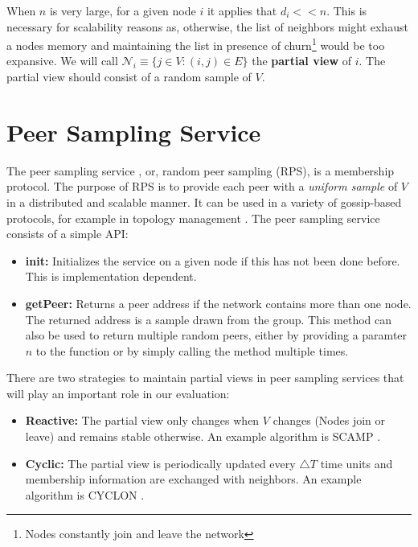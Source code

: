 \documentclass[11pt, english, screen]{report-rd-info}
\begin{document}
When $n$ is very large, for a given node $i$ it applies that $d_i << n$.
This is necessary for scalability reasons as, otherwise, the list of neighbors might exhaust a nodes memory and maintaining the list in presence of churn\footnote{Nodes constantly join and leave the network} would be too expansive.
We will call $\mathcal{N}_i \equiv \{j\in V:(i,j)\in E\}$ the \textbf{partial view} of $i$.
The partial view should consist of a random sample of $V$.

\section{Peer Sampling Service}

The peer sampling service \cite{Jelasity:2004:PSS:1045658.1045666}, or, random peer sampling (RPS), is a membership protocol.
The purpose of RPS is to provide each peer with a \emph{uniform sample} of $V$ in a distributed and scalable manner.
It can be used in a variety of gossip-based protocols, for example in topology management \cite{Jelasity:2009:TGF:1570533.1570626}. 
The peer sampling service consists of a simple API:

\begin{itemize}
    \item{\textbf{init:}} Initializes the service on a given node if this has not been done before. This is implementation dependent.
    \item{\textbf{getPeer:}} Returns a peer address if the network contains more than one node. The returned address is a sample drawn from the group. This method can also be used to return multiple random peers, either by providing a paramter $n$ to the function or by simply calling the method multiple times.
\end{itemize}

There are two strategies to maintain partial views in peer sampling services \cite{Leitao_gossip-basedbroadcast} that will play an important role in our evaluation:

\begin{itemize}
    \item{\textbf{Reactive:} The partial view only changes when $V$ changes (Nodes join or leave) and remains stable otherwise.
An example algorithm is SCAMP \cite{Ganesh:2001:SPL:648089.747488}.}
    \item{\textbf{Cyclic:} The partial view is periodically updated every $\bigtriangleup T$ time units and membership information are exchanged with neighbors.
An example algorithm is CYCLON \cite{Voulgaris05cyclon:inexpensive}.}
\end{itemize}
\end{document}
